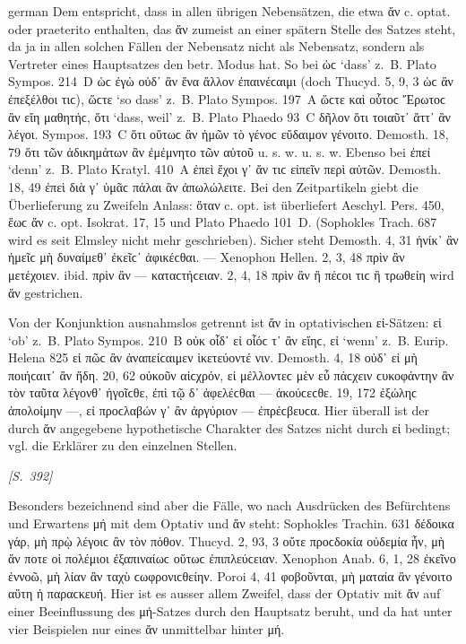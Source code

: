 \begin{otherlanguage*}{german}
Dem entspricht, dass in allen übrigen Nebensätzen, die etwa ἄν c. optat. oder praeterito enthalten, das ἄν zumeist an einer spätern Stelle des Satzes steht, da ja in allen solchen Fällen der Nebensatz nicht als Nebensatz, sondern als Vertreter eines Hauptsatzes den betr. Modus hat. So bei ὡϲ ‘dass’ z.~B. Plato Sympos. 214~D ὡϲ ἐγὼ οὐδ᾽ ἂν ἕνα ἄλλον ἐπαινέϲαιμι (doch Thucyd. 5, 9, 3 ὡϲ ἂν ἐπεξέλθοι τιϲ), ὥϲτε ‘so dass’ z.~B. Plato Sympos. 197~A ὥϲτε καὶ οὗτοϲ Ἔρωτοϲ ἂν εἴη μαθητήϲ, ὅτι ‘dass, weil’ z.~Β. Plato Phaedo 93~C δῆλον ὅτι τοιαῦτ᾽ ἄττ᾽ ἂν λέγοι. Sympos. 193~C ὅτι οὕτωϲ ἂν ἡμῶν τὸ γένοϲ εὔδαιμον γένοιτο. Demosth. 18, 79 ὅτι τῶν ἀδικημάτων ἂν ἐμέμνητο τῶν αὑτοῦ u. s. w. u. s. w. Ebenso bei ἐπεί ‘denn’ z.~B. Plato Kratyl. 410~A ἐπεὶ ἔχοι γ᾽ ἄν τιϲ εἰπεῖν περὶ αὐτῶν. Demosth. 18, 49 ἐπεὶ διὰ γ᾽ ὑμᾶϲ πάλαι ἂν ἀπωλώλειτε. Bei den Zeitpartikeln giebt die Überlieferung zu Zweifeln Anlass: ὅταν c. opt. ist überliefert Aeschyl. Pers. 450, ἕωϲ ἄν c. opt. Isokrat. 17, 15 und Plato Phaedo 101~D. (Sophokles Trach. 687 wird es seit Elmsley nicht mehr geschrieben). Sicher steht Demosth. 4, 31 ἡνίκ᾽ ἂν ἡμεῖϲ μὴ δυναίμεθ᾽ ἐκεῖϲ᾽ ἀφικέϲθαι. — Xenophon Hellen. 2, 3, 48 πρὶν ἂν μετέχοιεν. ibid. πρὶν ἂν — καταϲτήϲειαν. 2, 4, 18 πρὶν ἂν ἢ πέϲοι τιϲ ἢ τρωθείη wird ἄν gestrichen.

Von der Konjunktion ausnahmslos getrennt ist ἄν in optativischen εἰ-Sätzen: εἰ ‘ob’ z.~B. Plato Sympos. 210~B οὐκ οἶδ᾽ εἰ οἷόϲ τ᾽ ἂν εἴηϲ, εἰ ‘wenn’ z.~B. Eurip. Helena 825 εἰ πῶϲ ἂν ἀναπείϲαιμεν ἱκετεύοντέ νιν. Demosth. 4, 18 οὐδ᾽ εἰ μὴ ποιήϲαιτ᾽ ἂν ἤδη. 20, 62 οὐκοῦν αἰϲχρόν, εἰ μέλλοντεϲ μὲν εὖ πάϲχειν ϲυκοφάντην ἂν τὸν ταῦτα λέγονθ᾽ ἡγοῖϲθε, ἐπὶ τῷ δ᾽ ἀφελέϲθαι — ἀκούϲεϲθε. 19, 172 ἐξώληϲ ἀπολοίμην —, εἰ προϲλαβών γ᾽ ἂν ἀργύριον — ἐπρέϲβευϲα. Hier überall ist der durch ἄν angegebene hypothetische Charakter des Satzes nicht durch εἰ bedingt; vgl. die Erklärer zu den einzelnen Stellen.

\hypertarget{p392}{\emph{[S.~392]}}\label{p392} Besonders bezeichnend sind aber die Fälle, wo nach Ausdrücken des Befürchtens und Erwartens μή mit dem Optativ und ἄν steht: Sophokles Trachin. 631 δέδοικα γάρ, μὴ πρῲ λέγοιϲ ἂν τὸν πόθον. Thucyd. 2, 93, 3 οὔτε προϲδοκία οὐδεμία ἦν, μὴ ἄν ποτε οἱ πολέμιοι ἐξαπιναίωϲ οὕτωϲ ἐπιπλεύϲειαν. Xenophon Anab. 6, 1, 28 ἐκεῖνο ἐννοῶ, μὴ λίαν ἂν ταχὺ ϲωφρονιϲθείην. Poroi 4, 41 φο\-βοῦν\-ται, μὴ ματαία ἂν γένοιτο αὕτη ἡ παραϲκευή. Hier ist es ausser allem Zweifel, dass der Optativ mit ἄν auf einer Beeinflussung des μή-Satzes durch den Hauptsatz beruht, und da hat unter vier Beispielen nur eines ἄν unmittelbar hinter μή.


\end{otherlanguage*}
